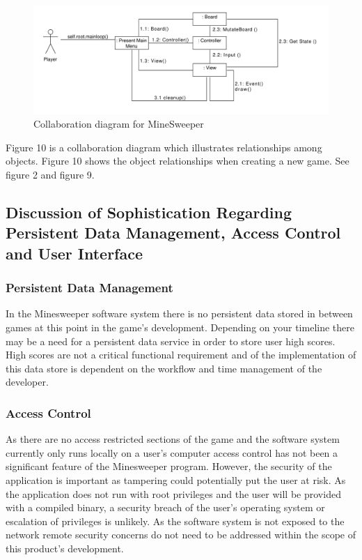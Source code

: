 \documentclass[12pt, a4]{report}
\begin{document}
%
%
\begin{figure}[!h]
	\centering
	\includegraphics[scale=0.6]{CollaborationDiagram}
	\caption{Collaboration diagram for MineSweeper}
\end{figure}
\par Figure 10 is a collaboration diagram which illustrates relationships among objects. Figure 10 shows the object relationships when creating a new game. See figure 2 and figure 9.


\newpage
\subsection{Discussion of Sophistication Regarding Persistent Data Management, Access Control and User Interface}
\subsubsection{Persistent Data Management}
In the Minesweeper software system there is no persistent data stored in between games at this point in the game's development. Depending on your timeline there may be a need for a persistent data service in order to store user high scores. High scores are not a critical functional requirement and of the implementation of this data store is dependent on the workflow and time management of the developer.

\subsubsection{Access Control}
As there are no access restricted sections of the game and the software system currently only runs locally on a user's computer access control has not been a significant feature of the Minesweeper program. However, the security of the application is important as tampering could potentially put the user at risk. As the application does not run with root privileges and the user will be provided with a compiled binary, a security breach of the user's operating system or escalation of privileges is unlikely. As the software system is not exposed to the network remote security concerns do not need to be addressed within the scope of this product's development.
\end{document}
